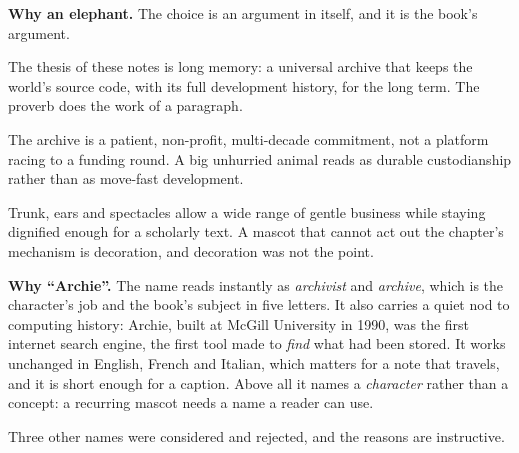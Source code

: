 \textbf{Why an elephant.} The choice is an argument in itself, and it is the book's argument.

\begin{description}[leftmargin=1.2em,itemsep=2pt,topsep=3pt]
  \item[An elephant never forgets.] The thesis of these notes is long memory: a universal
    archive that keeps the world's source code, with its full development history, for the long
    term. The proverb does the work of a paragraph.
  \item[Large, calm, dependable.] The archive is a patient, non-profit, multi-decade commitment,
    not a platform racing to a funding round. A big unhurried animal reads as durable
    custodianship rather than as move-fast development.
  \item[Expressive, and easy to pose.] Trunk, ears and spectacles allow a wide range of gentle
    business while staying dignified enough for a scholarly text. A mascot that cannot act out
    the chapter's mechanism is decoration, and decoration was not the point.
\end{description}

\textbf{Why \enquote{Archie}.} The name reads instantly as \emph{archivist} and \emph{archive},
which is the character's job and the book's subject in five letters. It also carries a quiet nod
to computing history: Archie, built at McGill University in 1990, was the first internet search
engine, the first tool made to \emph{find} what had been stored. It works unchanged in English,
French and Italian, which matters for a note that travels, and it is short enough for a caption.
Above all it names a \emph{character} rather than a concept: a recurring mascot needs a name a
reader can use.

Three other names were considered and rejected, and the reasons are instructive.


